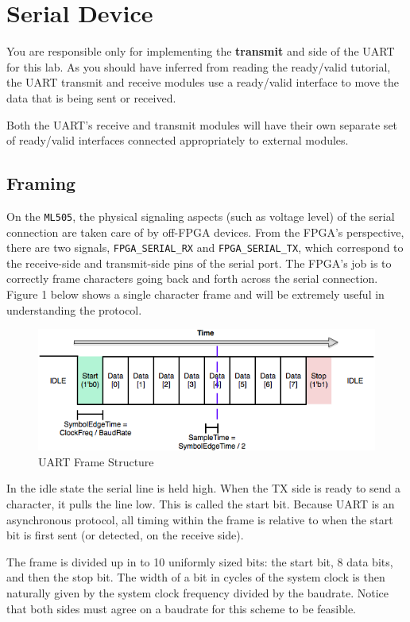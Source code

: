 \documentclass[11pt]{article}
\begin{document}
\section{Serial Device}
You are responsible only for implementing the \textbf{transmit} and  side of the UART for this lab. As you should have inferred from reading the ready/valid tutorial, the UART transmit and receive modules use a ready/valid interface to move the data that is being sent or received.

Both the UART’s receive and transmit modules will have their own separate set of ready/valid interfaces connected appropriately to external modules.

\subsection{Framing}
On the \verb|ML505|, the physical signaling aspects (such as voltage level) of the serial connection are taken care of by off-FPGA devices. From the FPGA's perspective, there are two signals, \verb|FPGA_SERIAL_RX| and \verb|FPGA_SERIAL_TX|, which correspond to the receive-side and transmit-side pins of the serial port.  The FPGA's job is to correctly frame characters going back and forth across the serial connection. Figure 1 below shows a single character frame and will be extremely useful in understanding the protocol.
\begin{figure}[H]
\centering
\includegraphics[width=6in]{images/uart_frame.png}
\caption{UART Frame Structure}
\end{figure}
In the idle state the serial line is held high. When the TX side is ready to send a character, it pulls the line low. This is called the start bit. Because UART is an asynchronous protocol, all timing within the frame is relative to when the start bit is first sent (or detected, on the receive side). 

The frame is divided up in to 10 uniformly sized bits: the start bit, 8 data bits, and then the stop bit. The width of a bit in cycles of the system clock is then naturally given by the system clock frequency divided by the baudrate. Notice that both sides must agree on a baudrate for this scheme to be feasible.
\end{document}
